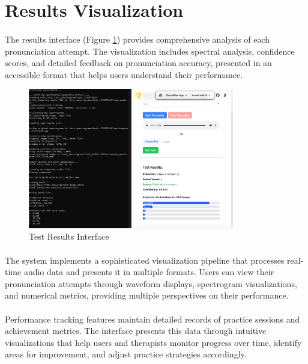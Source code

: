 \section{Results Visualization}
\label{sec:results-visualization}

\paragraph{}
The results interface (Figure \ref{fig:test_result}) provides comprehensive analysis of each pronunciation attempt. The visualization includes spectral analysis, confidence scores, and detailed feedback on pronunciation accuracy, presented in an accessible format that helps users understand their performance.

\begin{figure}[htbp]
    \centering
    \includegraphics[width=0.8\textwidth]{res/images/webapp/testResult.png}
    \caption{Test Results Interface}
    \label{fig:test_result}
\end{figure}

\paragraph{}
The system implements a sophisticated visualization pipeline that processes real-time audio data and presents it in multiple formats. Users can view their pronunciation attempts through waveform displays, spectrogram visualizations, and numerical metrics, providing multiple perspectives on their performance.

\paragraph{}
Performance tracking features maintain detailed records of practice sessions and achievement metrics. The interface presents this data through intuitive visualizations that help users and therapists monitor progress over time, identify areas for improvement, and adjust practice strategies accordingly.

